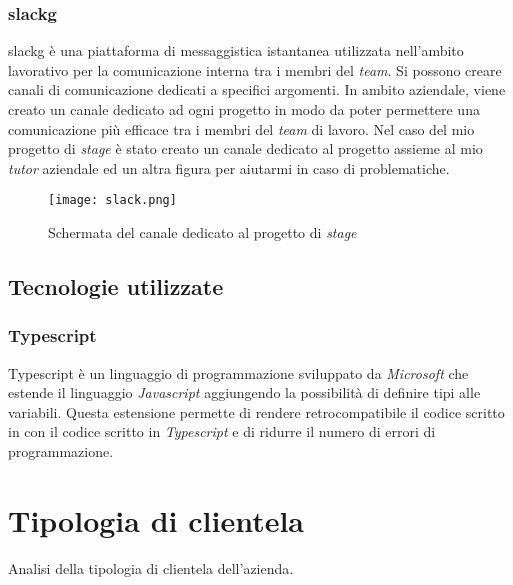 \subsubsection{\gls{slackg}}
\gls{slackg} è una piattaforma di messaggistica istantanea utilizzata nell'ambito lavorativo per la comunicazione interna tra i membri del \textit{team}.
Si possono creare canali di comunicazione dedicati a specifici argomenti. In ambito aziendale, viene creato un canale dedicato ad ogni progetto in modo da poter permettere una comunicazione più efficace tra i membri del \textit{team} di lavoro.
Nel caso del mio progetto di \textit{stage} è stato creato un canale dedicato al progetto assieme al mio \textit{tutor} aziendale ed un altra figura per aiutarmi in caso di problematiche.
\begin{figure}[H]
    \centering
    \texttt{[image: slack.png]}
    \caption{Schermata del canale dedicato al progetto di \textit{stage}}
    \label{fig:Slack}
\end{figure}
\subsection{Tecnologie utilizzate}
\subsubsection{Typescript}
Typescript è un linguaggio di programmazione sviluppato da \textit{Microsoft} che estende il linguaggio \textit{Javascript} aggiungendo la possibilità di definire tipi alle variabili.
Questa estensione permette di rendere retrocompatibile il codice scritto in  con il codice scritto in \textit{Typescript} e di ridurre il numero di errori di programmazione.





\section{Tipologia di clientela}
Analisi della tipologia di clientela dell'azienda.

